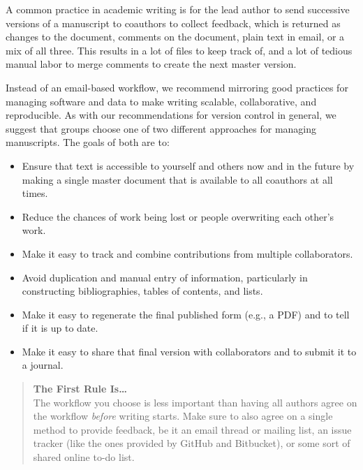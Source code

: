 \documentclass[10pt,letterpaper]{article}
\begin{document}
A common practice in academic writing is for the lead author to send
successive versions of a manuscript to coauthors to collect feedback,
which is returned as changes to the document, comments on the
document, plain text in email, or a mix of all three. This results in
a lot of files to keep track of, and a lot of tedious manual labor to
merge comments to create the next master version.

Instead of an email-based workflow, we recommend mirroring good
practices for managing software and data to make writing scalable,
collaborative, and reproducible.  As with our recommendations for
version control in general, we suggest that groups choose one of two
different approaches for managing manuscripts.  The goals of both are
to:

\begin{itemize}

\item
  Ensure that text is accessible to yourself and others now and in the
  future by making a single master document that is available to all
  coauthors at all times.

\item
  Reduce the chances of work being lost or people overwriting each
  other's work.

\item
  Make it easy to track and combine contributions from multiple
  collaborators.

\item
  Avoid duplication and manual entry of information, particularly in
  constructing bibliographies, tables of contents, and lists.

\item
  Make it easy to regenerate the final published form (e.g., a PDF)
  and to tell if it is up to date.

\item
  Make it easy to share that final version with collaborators and to
  submit it to a journal.

\end{itemize}

\begin{quote}
  \noindent \textbf{The First Rule Is{\ldots}}
  \\
  The workflow you choose is less important than having all authors
  agree on the workflow \emph{before} writing starts. Make sure to
  also agree on a single method to provide feedback, be it an email
  thread or mailing list, an issue tracker (like the ones provided by
  GitHub and Bitbucket), or some sort of shared online to-do list.
\end{quote}
\end{document}
